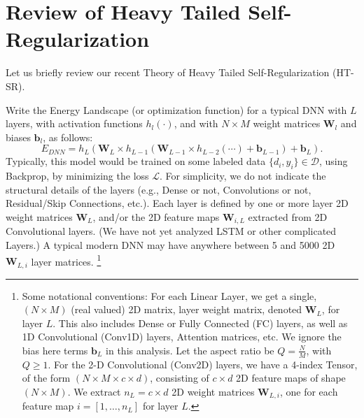 
\section{Review of Heavy Tailed Self-Regularization}
\label{sxn:theory-review}

Let us briefly review our recent Theory of Heavy Tailed Self-Regularization (HT-SR)\cite{MM18_TR}.

Write the Energy Landscape (or optimization function) for a typical DNN with $L$ layers, with activation functions $h_{l}(\cdot)$, and with $N\times M$ weight matrices $\mathbf{W}_{l}$ and biases $\mathbf{b}_{l}$, as follows:
\begin{equation}
E_{DNN}=h_{L}(\mathbf{W}_{L}\times h_{L-1}(\mathbf{W}_{L-1}\times h_{L-2}(\cdots)+\mathbf{b}_{L-1})+\mathbf{b}_{L})  .
\label{eqn:dnn_energy}
\end{equation}
Typically, this model would be trained on some labeled data $\{d_{i},y_{i}\}\in\mathcal{D}$, using Backprop, by minimizing the loss $\mathcal{L}$.
For simplicity, we do not indicate the structural details of the layers (e.g., Dense or not, Convolutions or not, Residual/Skip Connections, etc.). 
Each layer is defined by one or more layer 2D weight matrices $\mathbf{W}_{L}$, and/or the 2D feature maps $\mathbf{W}_{i,L}$ extracted from 2D Convolutional layers.
(We have not yet analyzed LSTM or other complicated Layers.) 
A typical modern DNN may have anywhere between 5 and 5000 2D $\mathbf{W}_{L,i}$ layer matrices.  \footnote{Some notational conventions:
For each Linear Layer, we get a  single, $(N\times M)$ (real valued) 2D matrix, layer weight matrix, denoted $\mathbf{W}_{L}$, for layer $L$.  
This also includes Dense or Fully Connected (FC) layers, as well as 1D Convolutional (Conv1D) layers, Attention matrices, etc.
We ignore the bias here terms $\mathbf{b}_{L}$ in this analysis. 
Let the aspect ratio be $Q=\frac{N}{M}$, with $Q\ge 1$.
For the 2-D Convolutional (Conv2D) layers, we have a 4-index Tensor, of the form $(N\times M \times c\times d)$, consisting
of $c\times d$ 2D feature maps of shape $(N\times M)$.    
We  extract $n_{L}=c\times d$ 2D weight matrices $\mathbf{W}_{L,i}$, one for each feature map $i=[1,\dots,n_{L}]$ for layer $L$.}
   
